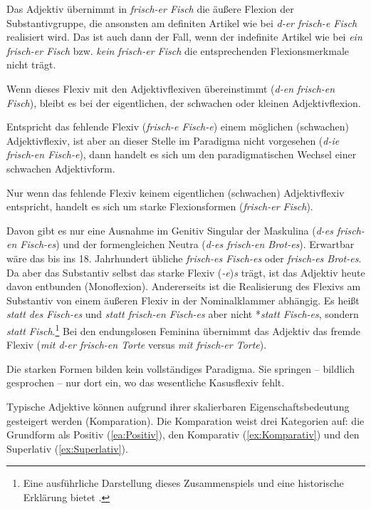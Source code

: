 Das Adjektiv übernimmt in \textit{frisch-er Fisch} die äußere Flexion der Substantivgruppe, die ansonsten am definiten Artikel wie bei \textit{d-er frisch-e Fisch} realisiert wird. Das ist auch dann der Fall, wenn der indefinite Artikel wie bei \textit{ein frisch-er Fisch} bzw. \textit{kein frisch-er Fisch} die entsprechenden Flexionsmerkmale nicht trägt.

Wenn dieses Flexiv mit den Adjektivflexiven übereinstimmt (\textit{d-en frisch-en Fisch}), bleibt es bei der eigentlichen, der schwachen oder kleinen Adjektivflexion.

Entspricht das fehlende Flexiv (\textit{frisch-e Fisch-e}) einem möglichen (schwachen) Adjektivflexiv, ist aber an dieser Stelle im Paradigma nicht vorgesehen (\textit{d-ie frisch-en Fisch-e}), dann handelt es sich um den paradigmatischen Wechsel einer schwachen Adjektivform. 

Nur wenn das fehlende Flexiv keinem eigentlichen (schwachen) Adjektivflexiv entspricht, handelt es sich um starke Flexionsformen (\textit{frisch-er Fisch}). 

Davon gibt es nur eine Ausnahme im Genitiv Singular der Maskulina (\textit{d-es frisch-en Fisch-es}) und der formengleichen Neutra (\textit{d-es frisch-en Brot-es}). Erwartbar wäre das bis ins 18. Jahrhundert übliche \textit{frisch-es Fisch-es} oder \textit{frisch-es Brot-es}. Da aber das Substantiv selbst das starke Flexiv (\textit{-e})\textit{s} trägt, ist das Adjektiv heute davon entbunden (Monoflexion). Andererseits ist die Realisierung des Flexivs am Substantiv von einem äußeren Flexiv in der Nominalklammer abhängig. Es heißt \textit{statt des Fisch-es} und \textit{statt frisch-en Fisch-es} aber nicht *\textit{statt Fisch-es}, sondern \textit{statt Fisch}.\footnote{Eine ausführliche Darstellung dieses Zusammenspiels und eine historische Erklärung bietet \citet[35--39]{Agel1996}.} Bei den endungslosen Feminina übernimmt das Adjektiv das fremde Flexiv (\textit{mit d-er frisch-en Torte} versus \textit{mit frisch-er Torte}).

Die starken Formen bilden kein vollständiges Paradigma. Sie springen -- bildlich gesprochen -- nur dort ein, wo das wesentliche Kasusflexiv fehlt. 

\largerpage
Typische Adjektive können aufgrund ihrer skalierbaren Eigenschaftsbedeutung gesteigert werden (Komparation). Die Komparation weist drei Kategorien auf: die Grundform als Positiv (\ref{ea:Positiv}), den Komparativ (\ref{ex:Komparativ}) und den Superlativ (\ref{ex:Superlativ}).

